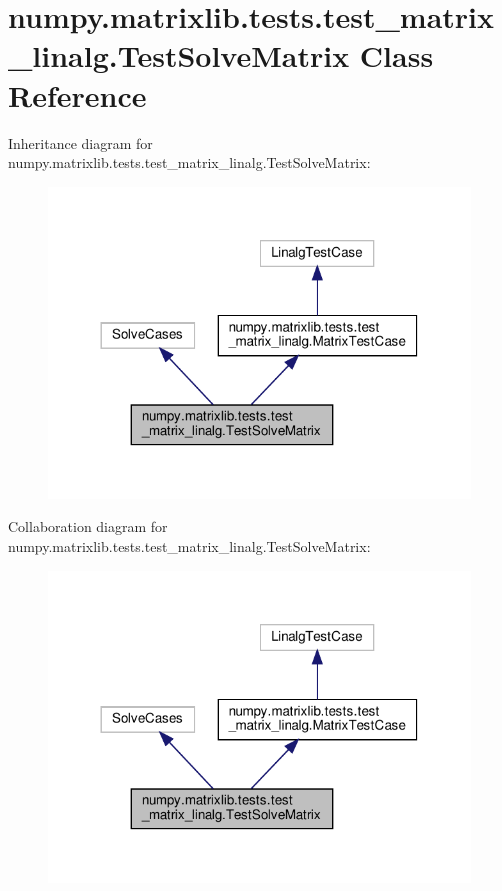\hypertarget{classnumpy_1_1matrixlib_1_1tests_1_1test__matrix__linalg_1_1TestSolveMatrix}{}\section{numpy.\+matrixlib.\+tests.\+test\+\_\+matrix\+\_\+linalg.\+Test\+Solve\+Matrix Class Reference}
\label{classnumpy_1_1matrixlib_1_1tests_1_1test__matrix__linalg_1_1TestSolveMatrix}


Inheritance diagram for numpy.\+matrixlib.\+tests.\+test\+\_\+matrix\+\_\+linalg.\+Test\+Solve\+Matrix\+:
\nopagebreak
\begin{figure}[H]
\begin{center}
\leavevmode
\includegraphics[width=317pt]{classnumpy_1_1matrixlib_1_1tests_1_1test__matrix__linalg_1_1TestSolveMatrix__inherit__graph}
\end{center}
\end{figure}


Collaboration diagram for numpy.\+matrixlib.\+tests.\+test\+\_\+matrix\+\_\+linalg.\+Test\+Solve\+Matrix\+:
\nopagebreak
\begin{figure}[H]
\begin{center}
\leavevmode
\includegraphics[width=317pt]{classnumpy_1_1matrixlib_1_1tests_1_1test__matrix__linalg_1_1TestSolveMatrix__coll__graph}
\end{center}
\end{figure}
